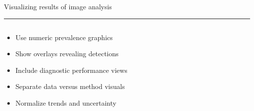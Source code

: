 \documentclass[aspectratio=169]{beamer}
\newcommand{\TitleFont}{\rmfamily}
\begin{document}
\begin{frame}[t]{}
  \vspace*{0.5cm}
  {\TitleFont\fontsize{18}{22}\selectfont\color{LUBronze}Visualizing results of image analysis\par}
  \vspace{0.3em}
  {\color{LUBronze}\rule{\linewidth}{0.8pt}}\par
  \vspace{0.2cm}
  \begin{columns}[t]
    \begin{column}[t]{0.45\textwidth}
      \vspace*{0pt}
      \begin{itemize}\setlength\itemsep{0.65em}
        \item Use numeric prevalence graphics
        \item Show overlays revealing detections
        \item Include diagnostic performance views
        \item Separate data versus method visuals
        \item Normalize trends and uncertainty
      \end{itemize}
    \end{column}
  \end{columns}
\end{frame}
\end{document}
